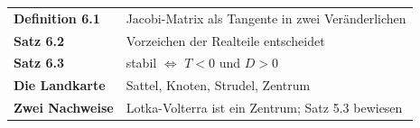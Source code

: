 \begin{merksatz}
\begin{center}
\renewcommand{\arraystretch}{1.5}
\begin{tabular}{@{}P{3.0cm}P{5.6cm}@{}}
\toprule
\textbf{Definition 6.1} & Jacobi-Matrix als Tangente in zwei Veränderlichen\\
\textbf{Satz 6.2} & Vorzeichen der Realteile entscheidet\\
\textbf{Satz 6.3} & stabil $\iff$ $T<0$ und $D>0$\\
\textbf{Die Landkarte} & Sattel, Knoten, Strudel, Zentrum\\
\textbf{Zwei Nachweise} & Lotka-Volterra ist ein Zentrum; Satz 5.3 bewiesen\\
\bottomrule
\end{tabular}
\end{center}

\begin{center}
\begin{minipage}{0.88\textwidth}
\end{minipage}
\end{center}
\end{merksatz}
